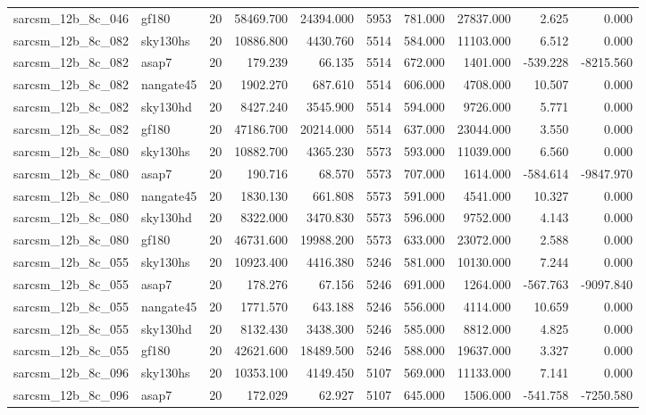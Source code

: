 \documentclass{article}
\begin{document}
\begin{longtable}{llrrrrrrrr}
sarcsm\_12b\_8c\_046 & gf180 & 20 & 58469.700 & 24394.000 & 5953 & 781.000 & 27837.000 & 2.625 & 0.000 \\
sarcsm\_12b\_8c\_082 & sky130hs & 20 & 10886.800 & 4430.760 & 5514 & 584.000 & 11103.000 & 6.512 & 0.000 \\
sarcsm\_12b\_8c\_082 & asap7 & 20 & 179.239 & 66.135 & 5514 & 672.000 & 1401.000 & -539.228 & -8215.560 \\
sarcsm\_12b\_8c\_082 & nangate45 & 20 & 1902.270 & 687.610 & 5514 & 606.000 & 4708.000 & 10.507 & 0.000 \\
sarcsm\_12b\_8c\_082 & sky130hd & 20 & 8427.240 & 3545.900 & 5514 & 594.000 & 9726.000 & 5.771 & 0.000 \\
sarcsm\_12b\_8c\_082 & gf180 & 20 & 47186.700 & 20214.000 & 5514 & 637.000 & 23044.000 & 3.550 & 0.000 \\
sarcsm\_12b\_8c\_080 & sky130hs & 20 & 10882.700 & 4365.230 & 5573 & 593.000 & 11039.000 & 6.560 & 0.000 \\
sarcsm\_12b\_8c\_080 & asap7 & 20 & 190.716 & 68.570 & 5573 & 707.000 & 1614.000 & -584.614 & -9847.970 \\
sarcsm\_12b\_8c\_080 & nangate45 & 20 & 1830.130 & 661.808 & 5573 & 591.000 & 4541.000 & 10.327 & 0.000 \\
sarcsm\_12b\_8c\_080 & sky130hd & 20 & 8322.000 & 3470.830 & 5573 & 596.000 & 9752.000 & 4.143 & 0.000 \\
sarcsm\_12b\_8c\_080 & gf180 & 20 & 46731.600 & 19988.200 & 5573 & 633.000 & 23072.000 & 2.588 & 0.000 \\
sarcsm\_12b\_8c\_055 & sky130hs & 20 & 10923.400 & 4416.380 & 5246 & 581.000 & 10130.000 & 7.244 & 0.000 \\
sarcsm\_12b\_8c\_055 & asap7 & 20 & 178.276 & 67.156 & 5246 & 691.000 & 1264.000 & -567.763 & -9097.840 \\
sarcsm\_12b\_8c\_055 & nangate45 & 20 & 1771.570 & 643.188 & 5246 & 556.000 & 4114.000 & 10.659 & 0.000 \\
sarcsm\_12b\_8c\_055 & sky130hd & 20 & 8132.430 & 3438.300 & 5246 & 585.000 & 8812.000 & 4.825 & 0.000 \\
sarcsm\_12b\_8c\_055 & gf180 & 20 & 42621.600 & 18489.500 & 5246 & 588.000 & 19637.000 & 3.327 & 0.000 \\
sarcsm\_12b\_8c\_096 & sky130hs & 20 & 10353.100 & 4149.450 & 5107 & 569.000 & 11133.000 & 7.141 & 0.000 \\
sarcsm\_12b\_8c\_096 & asap7 & 20 & 172.029 & 62.927 & 5107 & 645.000 & 1506.000 & -541.758 & -7250.580 \\

\end{longtable}
\end{document}
